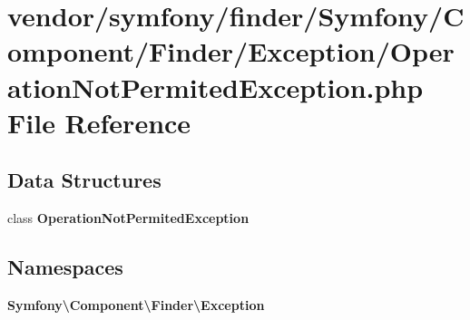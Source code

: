 \section{vendor/symfony/finder/\+Symfony/\+Component/\+Finder/\+Exception/\+Operation\+Not\+Permited\+Exception.php File Reference}
\label{_operation_not_permited_exception_8php}
\subsection*{Data Structures}
\begin{DoxyCompactItemize}
\item 
class {\bf Operation\+Not\+Permited\+Exception}
\end{DoxyCompactItemize}
\subsection*{Namespaces}
\begin{DoxyCompactItemize}
\item 
 {\bf Symfony\textbackslash{}\+Component\textbackslash{}\+Finder\textbackslash{}\+Exception}
\end{DoxyCompactItemize}
